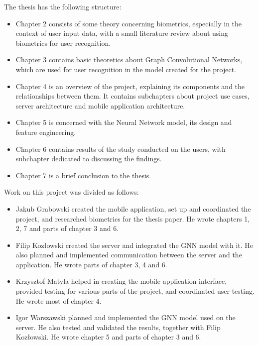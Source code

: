 The thesis has the following structure:
\begin{itemize}
    \item Chapter 2 consists of some theory concerning biometrics, especially in the context of user input data, with a small literature review about using biometrics for user recognition.
    \item Chapter 3 contains basic theoretics about Graph Convolutional Networks, which are used for user recognition in the model created for the project.
    \item Chapter 4 is an overview of the project, explaining its components and the relationships between them. It contains subchapters about project use cases, server architecture and mobile application architecture.
    \item Chapter 5 is concerned with the Neural Network model, its design and feature engineering.
    \item Chapter 6 contains results of the study conducted on the users, with subchapter dedicated to discussing the findings.
    \item Chapter 7 is a brief conclusion to the thesis.
\end{itemize}


Work on this project was divided as follows:
\begin{itemize}
    \item Jakub Grabowski created the mobile application, set up and coordinated the project, and researched biometrics for the thesis paper. He wrote chapters 1, 2, 7 and parts of chapter 3 and 6.
    \item Filip Kozłowski created the server and integrated the GNN model with it. He also planned and implemented communication between the server and the application. He wrote parts of chapter 3, 4 and 6. 
    \item Krzysztof Matyla helped in creating the mobile application interface, provided testing for various parts of the project, and coordinated user testing. He wrote most of chapter 4.
    \item Igor Warszawski planned and implemented the GNN model used on the server. He also tested and validated the results, together with Filip Kozłowski. He wrote chapter 5 and parts of chapter 3 and 6.
\end{itemize}
